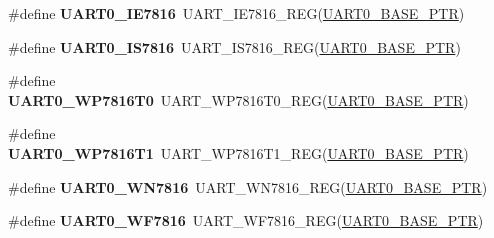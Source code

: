 \begin{DoxyCompactItemize}
\item 
\hypertarget{group___u_a_r_t___register___accessor___macros_ga9c574540438e8fbde7f5cd15b769a26b}{}\#define {\bfseries U\+A\+R\+T0\+\_\+\+I\+E7816}~U\+A\+R\+T\+\_\+\+I\+E7816\+\_\+\+R\+E\+G(\hyperlink{group___u_a_r_t___peripheral_ga50a02c91ffbd11fa7b4f0c33fe585199}{U\+A\+R\+T0\+\_\+\+B\+A\+S\+E\+\_\+\+P\+T\+R})\label{group___u_a_r_t___register___accessor___macros_ga9c574540438e8fbde7f5cd15b769a26b}

\item 
\hypertarget{group___u_a_r_t___register___accessor___macros_ga172a0f152249a9343a0b926e2db50c14}{}\#define {\bfseries U\+A\+R\+T0\+\_\+\+I\+S7816}~U\+A\+R\+T\+\_\+\+I\+S7816\+\_\+\+R\+E\+G(\hyperlink{group___u_a_r_t___peripheral_ga50a02c91ffbd11fa7b4f0c33fe585199}{U\+A\+R\+T0\+\_\+\+B\+A\+S\+E\+\_\+\+P\+T\+R})\label{group___u_a_r_t___register___accessor___macros_ga172a0f152249a9343a0b926e2db50c14}

\item 
\hypertarget{group___u_a_r_t___register___accessor___macros_gae40d003e55ce610c8e3d54a01d1f034a}{}\#define {\bfseries U\+A\+R\+T0\+\_\+\+W\+P7816\+T0}~U\+A\+R\+T\+\_\+\+W\+P7816\+T0\+\_\+\+R\+E\+G(\hyperlink{group___u_a_r_t___peripheral_ga50a02c91ffbd11fa7b4f0c33fe585199}{U\+A\+R\+T0\+\_\+\+B\+A\+S\+E\+\_\+\+P\+T\+R})\label{group___u_a_r_t___register___accessor___macros_gae40d003e55ce610c8e3d54a01d1f034a}

\item 
\hypertarget{group___u_a_r_t___register___accessor___macros_ga972796136dccc81184d7b7840db5dfc3}{}\#define {\bfseries U\+A\+R\+T0\+\_\+\+W\+P7816\+T1}~U\+A\+R\+T\+\_\+\+W\+P7816\+T1\+\_\+\+R\+E\+G(\hyperlink{group___u_a_r_t___peripheral_ga50a02c91ffbd11fa7b4f0c33fe585199}{U\+A\+R\+T0\+\_\+\+B\+A\+S\+E\+\_\+\+P\+T\+R})\label{group___u_a_r_t___register___accessor___macros_ga972796136dccc81184d7b7840db5dfc3}

\item 
\hypertarget{group___u_a_r_t___register___accessor___macros_ga076b41489eb41b58c9223b47025ab571}{}\#define {\bfseries U\+A\+R\+T0\+\_\+\+W\+N7816}~U\+A\+R\+T\+\_\+\+W\+N7816\+\_\+\+R\+E\+G(\hyperlink{group___u_a_r_t___peripheral_ga50a02c91ffbd11fa7b4f0c33fe585199}{U\+A\+R\+T0\+\_\+\+B\+A\+S\+E\+\_\+\+P\+T\+R})\label{group___u_a_r_t___register___accessor___macros_ga076b41489eb41b58c9223b47025ab571}

\item 
\hypertarget{group___u_a_r_t___register___accessor___macros_ga1f1678af59afd4e7ada94a6f9a4c1219}{}\#define {\bfseries U\+A\+R\+T0\+\_\+\+W\+F7816}~U\+A\+R\+T\+\_\+\+W\+F7816\+\_\+\+R\+E\+G(\hyperlink{group___u_a_r_t___peripheral_ga50a02c91ffbd11fa7b4f0c33fe585199}{U\+A\+R\+T0\+\_\+\+B\+A\+S\+E\+\_\+\+P\+T\+R})\label{group___u_a_r_t___register___accessor___macros_ga1f1678af59afd4e7ada94a6f9a4c1219}


\end{DoxyCompactItemize}
